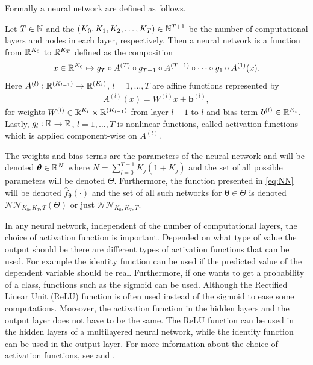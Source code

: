 Formally a neural network are defined as follows.
\begin{defn}\label{def:NN}
    Let $T \in \mathbb{N}$ and the $(K_0, K_1, K_2, \ldots, K_T) \in\mathbb{N}^{T+1}$ be the number of computational layers and nodes in each layer, respectively. Then a neural network is a function from $\mathbb{R}^{K_0}$ to $\mathbb{R}^{K_T}$ defined as the composition
    \begin{align}\label{eq:NN}
        x \in \mathbb{R}^{K_0} \mapsto g_T \circ A^{(T)} \circ g_{T-1} \circ A^{(T-1)} \circ \cdots \circ g_1 \circ A^{(1)}(x).
    \end{align}
    Here $A^{(l)}: \mathbb{R}^{(K_{l-1})} \to \mathbb{R}^{(K_l)}$, $l = 1, \ldots, T$ are affine functions represented by 
    \begin{align*}
        A^{(l)}(x) = W^{(l)} x + \bm{b}^{(l)},
    \end{align*}
    for weights $W^{(l)} \in \mathbb{R}^{K_l} \times \mathbb{R}^{(K_{l-1})}$ from layer $l-1$ to $l$ and bias term $\bm{b}^{(l)} \in \mathbb{R}^{K_l}$. Lastly, $g_l: \mathbb{R} \to \mathbb{R}$, $l = 1, \ldots, T$ is nonlinear functions, called activation functions which is applied component-wise on $A^{(l)}$.
\end{defn} 

The weights and bias terms are the parameters of the neural network and will be denoted $\bm{\theta} \in \mathbb{R}^{N}$ where $N = \sum_{l = 0}^{T-1} K_j(1+K_j)$ and the set of all possible parameters will be denoted $\Theta$. Furthermore, the function presented in \eqref{eq:NN} will be denoted $\hat{f}_{\bm{\theta}}(\cdot)$ and the set of all such networks for $\bm{\theta} \in \Theta$ is denoted $\mathcal{NN}_{K_0, K_T, T}(\Theta)$ or just $\mathcal{NN}_{K_0, K_T, T}$.

In any neural network, independent of the number of computational layers, the choice of activation function is important. Depended on what type of value the output should be there are different types of activation functions that can be used. For example the identity function can be used if the predicted value of the dependent variable should be real. Furthermore, if one wants to get a probability of a class, functions such as the sigmoid can be used. Although the Rectified Linear Unit (ReLU) function is often used instead of the sigmoid to ease some computations. Moreover, the activation function in the hidden layers and the output layer does not have to be the same. The ReLU function can be used in the hidden layers of a multilayered neural network, while the identity function can be used in the output layer. For more information about the choice of activation functions, see \citep[p. 2-6]{NNDesign} and \citep[p. 11-13]{NNDL}.


